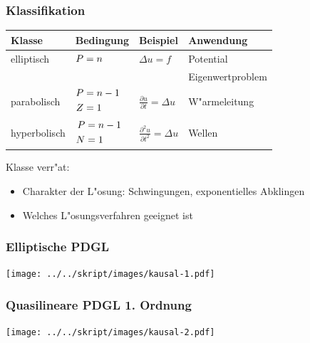 
\begin{frame}
\frametitle{Klassifikation}

\begin{center}
\begin{tabular}{llll}
Klasse&Bedingung&Beispiel&Anwendung\\
\hline
elliptisch &$\begin{aligned}P&=n\mathstrut\end{aligned}$
	&$\displaystyle \Delta u=f                                $
		&Potential\\
&	&	&Eigenwertproblem\\
\hline
parabolisch&%
$\begin{aligned}P&=n-1\mathstrut\\Z&=1\mathstrut\end{aligned}$
	&$\displaystyle \frac{\partial u}{\partial t}=\Delta u    $
		&W"armeleitung\\
\hline
hyperbolisch&%
$\begin{aligned}P&=n-1\mathstrut\\N&=1\mathstrut\end{aligned}$
	&$\displaystyle \frac{\partial^2 u}{\partial t^2}=\Delta u$
		&Wellen\\
\hline
\end{tabular}
\end{center}

Klasse verr"at:
\begin{itemize}
\item Charakter der L"osung: Schwingungen, exponentielles Abklingen
\item Welches L"osungsverfahren geeignet ist
\end{itemize}

\end{frame}

\begin{frame}
\frametitle{Elliptische PDGL}
\begin{center}
\texttt{[image: ../../skript/images/kausal-1.pdf]}
\end{center}
\end{frame}

\begin{frame}
\frametitle{Quasilineare PDGL 1. Ordnung}
\begin{center}
\texttt{[image: ../../skript/images/kausal-2.pdf]}
\end{center}
\end{frame}

